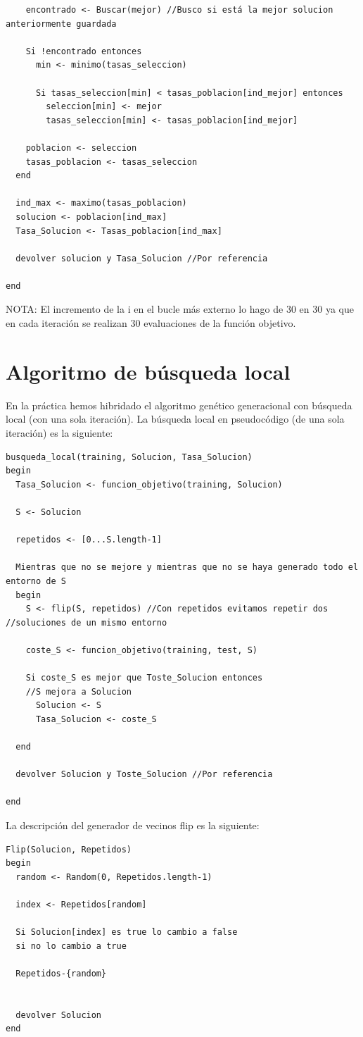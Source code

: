 \begin{lstlisting}
    encontrado <- Buscar(mejor) //Busco si está la mejor solucion anteriormente guardada
    
    Si !encontrado entonces
      min <- minimo(tasas_seleccion)
      
      Si tasas_seleccion[min] < tasas_poblacion[ind_mejor] entonces
        seleccion[min] <- mejor
        tasas_seleccion[min] <- tasas_poblacion[ind_mejor]
        
    poblacion <- seleccion
    tasas_poblacion <- tasas_seleccion
  end
  
  ind_max <- maximo(tasas_poblacion)
  solucion <- poblacion[ind_max]
  Tasa_Solucion <- Tasas_poblacion[ind_max]
  
  devolver solucion y Tasa_Solucion //Por referencia
  
end
\end{lstlisting}
NOTA: El incremento de la i en el bucle más externo lo hago de 30 en 30 ya que en cada iteración se realizan 30 evaluaciones de la función objetivo.

\section{Algoritmo de búsqueda local}
En la práctica hemos hibridado el algoritmo genético generacional con búsqueda local (con una sola iteración). La búsqueda local en pseudocódigo (de una sola iteración) es la siguiente:

\begin{lstlisting}
busqueda_local(training, Solucion, Tasa_Solucion)
begin
  Tasa_Solucion <- funcion_objetivo(training, Solucion)

  S <- Solucion

  repetidos <- [0...S.length-1]
    
  Mientras que no se mejore y mientras que no se haya generado todo el entorno de S
  begin
    S <- flip(S, repetidos) //Con repetidos evitamos repetir dos 			//soluciones de un mismo entorno

    coste_S <- funcion_objetivo(training, test, S)

    Si coste_S es mejor que Toste_Solucion entonces
    //S mejora a Solucion
      Solucion <- S
      Tasa_Solucion <- coste_S

  end
  
  devolver Solucion y Toste_Solucion //Por referencia
  
end
\end{lstlisting}

La descripción del generador de vecinos flip es la siguiente:
\begin{lstlisting}
Flip(Solucion, Repetidos)
begin
  random <- Random(0, Repetidos.length-1)

  index <- Repetidos[random]

  Si Solucion[index] es true lo cambio a false
  si no lo cambio a true

  Repetidos-{random}


  devolver Solucion
end
\end{lstlisting}


